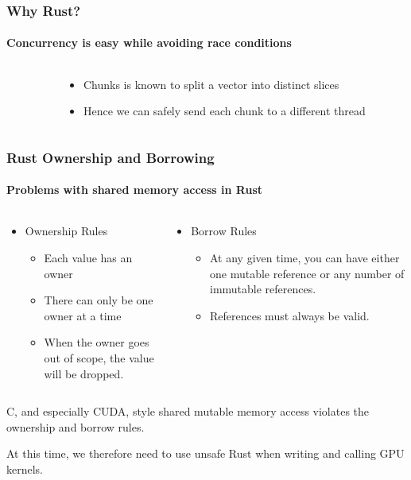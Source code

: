 \documentclass[aspectratio=169]{beamer}
\begin{document}
\begin{frame}
	\frametitle{Why Rust?}
	\framesubtitle{Concurrency is easy while avoiding race conditions}
	\begin{columns}
		\begin{column}{ 0.5\textwidth }
			
		\end{column}
		\begin{column}{ 0.4\textwidth }
			\begin{itemize}
				\item Chunks is known to split a vector into distinct slices
				\item Hence we can safely send each chunk to a different thread
			\end{itemize}
		\end{column}
	\end{columns}
\end{frame}

\begin{frame}
	\frametitle{Rust Ownership and Borrowing}
	\framesubtitle{Problems with shared memory access in Rust}

	\begin{columns}
		\begin{column}{0.5\textwidth}
			\begin{itemize}
				\item Ownership Rules\cite[Ch04-01]{rust-book}
				      \begin{itemize}
					      \item Each value has an owner
					      \item There can only be one owner at a time
					      \item When the owner goes out of scope, the value will be dropped.
				      \end{itemize}
			\end{itemize}
		\end{column}
		\begin{column}{0.5\textwidth}
			\begin{itemize}
				\item Borrow Rules\cite[Ch04-02]{rust-book}
				      \begin{itemize}
					      \item At any given time, you can have either one mutable reference or any number of immutable references.
					      \item References must always be valid.
				      \end{itemize}
			\end{itemize}
		\end{column}
	\end{columns}

	\vspace{1cm}
	C, and especially CUDA, style shared mutable memory access violates the ownership and borrow rules.

	At this time, we therefore need to use unsafe Rust when writing and calling GPU kernels.
\end{frame}
\end{document}
